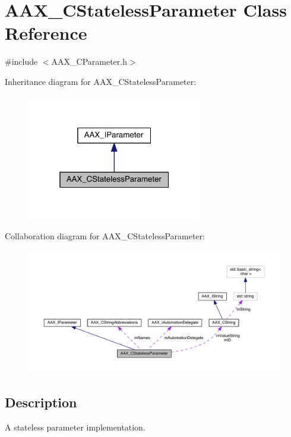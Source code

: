 \hypertarget{a00040}{}\section{A\+A\+X\+\_\+\+C\+Stateless\+Parameter Class Reference}
\label{a00040}


{\ttfamily \#include $<$A\+A\+X\+\_\+\+C\+Parameter.\+h$>$}



Inheritance diagram for A\+A\+X\+\_\+\+C\+Stateless\+Parameter\+:
\nopagebreak
\begin{figure}[H]
\begin{center}
\leavevmode
\includegraphics[width=217pt]{a00467}
\end{center}
\end{figure}


Collaboration diagram for A\+A\+X\+\_\+\+C\+Stateless\+Parameter\+:
\nopagebreak
\begin{figure}[H]
\begin{center}
\leavevmode
\includegraphics[width=350pt]{a00468}
\end{center}
\end{figure}


\subsection{Description}
A stateless parameter implementation. 

